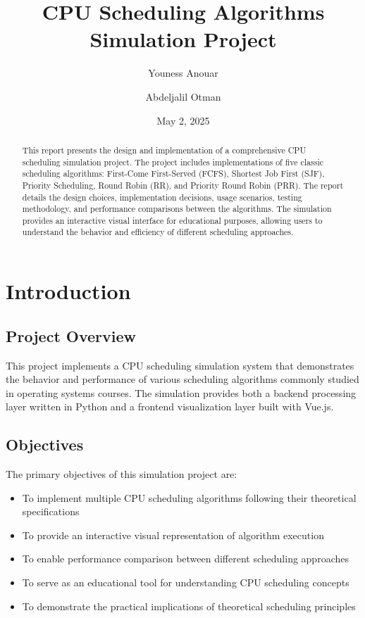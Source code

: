 \documentclass[12pt,a4paper]{report}
\title{CPU Scheduling Algorithms Simulation Project}
\author{Youness Anouar \and Abdeljalil Otman}
\date{May 2, 2025}
\begin{document}
\maketitle

\begin{abstract}
This report presents the design and implementation of a comprehensive CPU scheduling simulation project. The project includes implementations of five classic scheduling algorithms: First-Come First-Served (FCFS), Shortest Job First (SJF), Priority Scheduling, Round Robin (RR), and Priority Round Robin (PRR). The report details the design choices, implementation decisions, usage scenarios, testing methodology, and performance comparisons between the algorithms. The simulation provides an interactive visual interface for educational purposes, allowing users to understand the behavior and efficiency of different scheduling approaches.
\end{abstract}

\tableofcontents

\chapter{Introduction}
\section{Project Overview}
This project implements a CPU scheduling simulation system that demonstrates the behavior and performance of various scheduling algorithms commonly studied in operating systems courses. The simulation provides both a backend processing layer written in Python and a frontend visualization layer built with Vue.js.

\section{Objectives}
The primary objectives of this simulation project are:
\begin{itemize}
    \item To implement multiple CPU scheduling algorithms following their theoretical specifications
    \item To provide an interactive visual representation of algorithm execution
    \item To enable performance comparison between different scheduling approaches
    \item To serve as an educational tool for understanding CPU scheduling concepts
    \item To demonstrate the practical implications of theoretical scheduling principles
\end{itemize}
\end{document}
